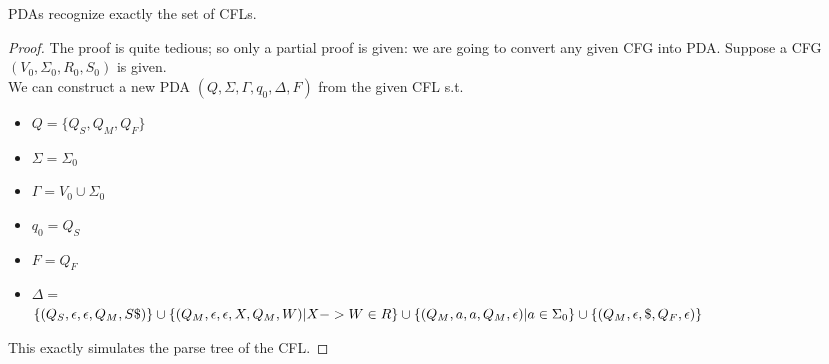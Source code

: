 \documentclass{report}
\begin{document}
			\begin{thm} \label{thm_PDA_CFL}
				PDAs recognize exactly the set of CFLs.
			\end{thm}
		
			\begin{proof}
				The proof is quite tedious; so only a partial proof is given: we are going to convert any given CFG into PDA.
				Suppose a CFG $(V_0,\Sigma_0,R_0,S_0)$ is given.\\
				We can construct a new PDA $(Q,\Sigma,\Gamma,q_0,\Delta,F)$ from the given CFL s.t.
				\begin{itemize}
					\item $Q=\{Q_S,Q_M,Q_F\}$
					\item $\Sigma=\Sigma_0$
					\item $\Gamma=V_0 \cup \Sigma_0$
					\item $q_0=Q_S$
					\item $F=Q_F$
					\item $\Delta=$\\
					\begin{math}
					\{(Q_S,\epsilon,\epsilon,Q_M,S\$)\}\cup\\
					\{(Q_M,\epsilon,\epsilon,X,Q_M,W)|X->W \in R\}\cup\\
					\{(Q_M,a,a,Q_M,\epsilon)|a \in \Sigma_0\}\cup\\
					\{(Q_M,\epsilon,\$,Q_F,\epsilon)\}
					\end{math}
				\end{itemize}
				This exactly simulates the parse tree of the CFL.
			\end{proof}
	
\end{document}
